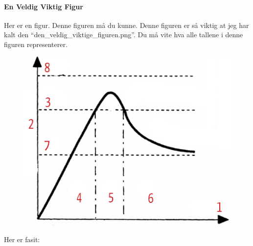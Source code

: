\paragraph{En Veldig Viktig Figur} Her er en figur. Denne figuren må du kunne. Denne figuren er så viktig at jeg har kalt den ``den_veldig_viktige_figuren.png''. Du må vite hva alle tallene i denne figuren representerer.
\begin{figure}[H]
	\centering
	\includegraphics[width=\linewidth]{den_veldig_viktige_figuren.png}
	\label{fig:viktig}
\end{figure}
Her er fasit:
